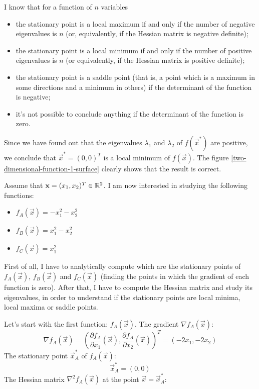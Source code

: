     I know that for a function of \(n\) variables
    \begin{itemize}
        \item the stationary point is a local maximum if and only if the number of negative eigenvalues is \(n\) (or, equivalently, if the Hessian matrix is negative definite);
        \item the stationary point is a local minimum if and only if the number of positive eigenvalues is \(n\) (or equivalently, if the Hessian matrix is positive definite);
        \item the stationary point is a saddle point (that is, a point which is a maximum in some directions and a minimum in others) if the determinant of the function is negative;
        \item it's not possible to conclude anything if the determinant of the function is zero.
    \end{itemize}
    Since we have found out that the eigenvalues \(\lambda_1\) and \(\lambda_2\) of \(f(\vec{x}^*)\) are positive, we conclude that \(\vec{x}^* = (0, 0)^T\) is a local minimum of \(f(\vec{x})\). The figure \ref{two-dimensional-function-1-surface} clearly shows that the result is correct.\par
    Assume that \(\mathbf{x} = (x_1, x_2)^T \in \mathbb{R}^2\). I am now interested in studying the following functions:
    \begin{itemize}
        \item \(f_A(\vec{x}) = -x_1^2-x_2^2\)
        \item \(f_B(\vec{x}) = x_1^2-x_2^2\)
        \item \(f_C(\vec{x}) = x_1^2\)
    \end{itemize}
    First of all, I have to analytically compute which are the stationary points of \(f_A(\vec{x})\), \(f_B(\vec{x})\) and \(f_C(\vec{x})\) (finding the points in which the gradient of each function is zero). After that, I have to compute the Hessian matrix and study its eigenvalues, in order to understand if the stationary points are local minima, local maxima or saddle points.\par
    Let's start with the first function: \(f_A(\vec{x})\). The gradient \(\nabla f_A(\vec{x})\):
    \[\nabla f_A(\vec{x}) = \left (\frac{\partial f_A}{\partial x_1}(\vec{x}), \frac{\partial f_A}{\partial x_2}(\vec{x}) \right )^T = (-2x_1, -2x_2)\]
    The stationary point \(\vec{x}_A^*\) of \(f_A(\vec{x})\):
    \[\vec{x}_A^* = (0, 0)\]
    The Hessian matrix \(\nabla^2 f_A(\vec{x})\) at the point \(\vec{x} = \vec{x}_A^*\):
